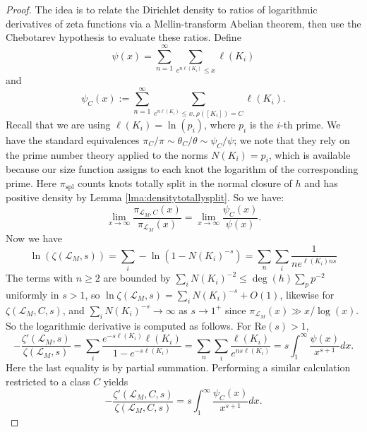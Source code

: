 \documentclass{amsart}
\theoremstyle{plain}
\theoremstyle{definition}
\theoremstyle{plain}
\theoremstyle{plain}
\theoremstyle{plain}
\theoremstyle{remark}
\theoremstyle{remark}
\theoremstyle{plain}
\theoremstyle{definition}
\theoremstyle{plain}
\theoremstyle{plain}
\theoremstyle{plain}
\numberwithin{equation}{section}
\begin{document}
\begin{proof}
The idea is to relate the Dirichlet density to ratios of logarithmic derivatives of zeta functions via a Mellin-transform Abelian theorem, then use the Chebotarev hypothesis to evaluate these ratios. Define 
\begin{equation}\label{eq:psi}
    \psi(x) = \sum_{n=1}^\infty\sum_{e^{n\ell(K_i)}\leq x}\ell(K_i)
\end{equation}
and
\begin{equation}
    \psi_C(x):=\sum_{n=1}^\infty\sum_{e^{n\ell(K_i)}\leq x, \rho([K_i]) = C}\ell(K_i).
\end{equation}
Recall that we are using $\ell(K_i) = \ln(p_i)$, where $p_i$ is the $i$-th prime. We have the standard equivalences $\pi_C/\pi \sim \theta_C/\theta \sim \psi_C/\psi$; we note that they rely on the prime number theory applied to the norms $N(K_i) = p_i$, which is available because our size function assigns to each knot the logarithm of the corresponding prime. Here $\pi_{\mathrm{spl}}$ counts knots totally split in the normal closure of $h$ and has positive density by Lemma \ref{lma:densitytotallysplit}. So we have:
\begin{equation}\label{eq:39}
   \lim_{x\rightarrow\infty}\frac{\pi_{\mathcal{L}_M,C}(x)}{\pi_{\mathcal{L}_M}(x)}= \lim_{x\rightarrow\infty}\frac{\psi_C(x)}{\psi(x)}.
\end{equation}
Now we have
\begin{equation}\label{eqt:logzeta}
    \ln(\zeta(\mathcal{L}_M, s)) = \sum_i-\ln(1-N(K_i)^{-s}) = \sum_n\sum_i\frac{1}{ne^{\ell(K_i)ns}}
\end{equation}
The terms with $n \geq 2$ are bounded by $\sum_i N(K_i)^{-2} \leq \deg(h)\sum_pp^{-2}$ uniformly in $s > 1$, so $\ln\zeta(\mathcal L_M, s) = \sum_iN(K_i)^{-s} + O(1)$, likewise for $\zeta(\mathcal L_M, C, s)$, and $\sum_iN(K_i)^{-s} \to \infty$ as $s \to 1^+$ since $\pi_{\mathcal L_M}(x) \gg x/\log(x)$. So the logarithmic derivative is computed as follows. For $\text{Re}(s) > 1$, 
\begin{equation}
    -\frac{\zeta '(\mathcal{L}_M, s)}{\zeta(\mathcal{L}_M,s)} = \sum_i\frac{e^{-s\ell(K_i)}\ell(K_i)}{1-e^{-s\ell(K_i)}}=\sum_n\sum_i\frac{\ell(K_i)}{e^{ns\ell(K_i)}}=s\int^\infty_1\frac{\psi(x)}{x^{s+1}}dx.    
\end{equation}
Here the last equality is by partial summation. Performing a similar calculation restricted to a class $C$ yields
\begin{equation}
    -\frac{\zeta'(\mathcal{L}_M, C, s)}{\zeta(\mathcal{L}_M, C, s)} = s\int_1^\infty\frac{\psi_C(x)}{x^{s+1}}dx.

\end{equation}
\end{proof}
\end{document}
